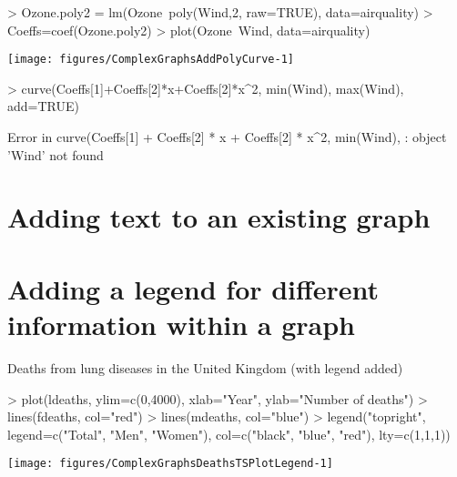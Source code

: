 \begin{Schunk}
\begin{Sinput}
> Ozone.poly2 = lm(Ozone~poly(Wind,2, raw=TRUE), data=airquality) 
> Coeffs=coef(Ozone.poly2) 
> plot(Ozone~Wind, data=airquality) 
\end{Sinput}

\texttt{[image: figures/ComplexGraphsAddPolyCurve-1]} \begin{Sinput}
> curve(Coeffs[1]+Coeffs[2]*x+Coeffs[2]*x^2, min(Wind), max(Wind), add=TRUE) 
\end{Sinput}
\begin{Soutput}
Error in curve(Coeffs[1] + Coeffs[2] * x + Coeffs[2] * x^2, min(Wind), : object 'Wind' not found
\end{Soutput}
\end{Schunk}

 
\section{Adding text to an existing graph} 
 
 
\section{Adding a legend for different information within a graph} 
 
\begin{exhibit} 
\begin{center} 
\caption{Deaths from lung diseases in the United Kingdom (with legend added)} 
\label{LungsLegend} 

\begin{Schunk}
\begin{Sinput}
> plot(ldeaths, ylim=c(0,4000), xlab="Year", ylab="Number of deaths") 
> lines(fdeaths, col="red") 
> lines(mdeaths, col="blue") 
> legend("topright", legend=c("Total", "Men", "Women"), col=c("black", "blue", "red"), lty=c(1,1,1)) 
\end{Sinput}

\texttt{[image: figures/ComplexGraphsDeathsTSPlotLegend-1]} \end{Schunk}

\end{center} 
\end{exhibit} 
 
